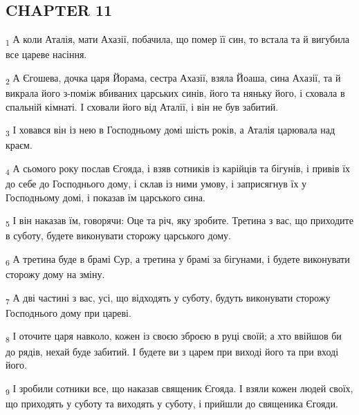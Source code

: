 \subsection{CHAPTER 11}
\begin{tcolorbox}
\textsubscript{1} А коли Аталія, мати Ахазії, побачила, що помер її син, то встала та й вигубила все цареве насіння.
\end{tcolorbox}
\begin{tcolorbox}
\textsubscript{2} А Єгошева, дочка царя Йорама, сестра Ахазії, взяла Йоаша, сина Ахазії, та й викрала його з-поміж вбиваних царських синів, його та няньку його, і сховала в спальній кімнаті. І сховали його від Аталії, і він не був забитий.
\end{tcolorbox}
\begin{tcolorbox}
\textsubscript{3} І ховався він із нею в Господньому домі шість років, а Аталія царювала над краєм.
\end{tcolorbox}
\begin{tcolorbox}
\textsubscript{4} А сьомого року послав Єгояда, і взяв сотників із карійців та бігунів, і привів їх до себе до Господнього дому, і склав із ними умову, і заприсягнув їх у Господньому домі, і показав їм царського сина.
\end{tcolorbox}
\begin{tcolorbox}
\textsubscript{5} І він наказав їм, говорячи: Оце та річ, яку зробите. Третина з вас, що приходите в суботу, будете виконувати сторожу царського дому.
\end{tcolorbox}
\begin{tcolorbox}
\textsubscript{6} А третина буде в брамі Сур, а третина у брамі за бігунами, і будете виконувати сторожу дому на зміну.
\end{tcolorbox}
\begin{tcolorbox}
\textsubscript{7} А дві частині з вас, усі, що відходять у суботу, будуть виконувати сторожу Господнього дому при цареві.
\end{tcolorbox}
\begin{tcolorbox}
\textsubscript{8} І оточите царя навколо, кожен із своєю зброєю в руці своїй; а хто ввійшов би до рядів, нехай буде забитий. І будете ви з царем при виході його та при вході його.
\end{tcolorbox}
\begin{tcolorbox}
\textsubscript{9} І зробили сотники все, що наказав священик Єгояда. І взяли кожен людей своїх, що приходять у суботу та виходять у суботу, і прийшли до священика Єгояди.
\end{tcolorbox}
